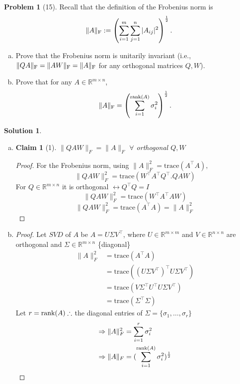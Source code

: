 \documentclass{amsart}[11pt]
\newtheorem*{claim}{Claim}
\theoremstyle{definition}
\newtheorem*{problem}{Problem}
\newtheorem*{solution}{Solution}
\newcommand{\R}{\mathbb{R}}
\newcommand{\rank}{\textnormal{rank}}
\newcommand{\fro}{\textnormal{F}}
\begin{document}
\begin{problem}[15]
Recall that the definition of the Frobenius norm is \[\|A\|_{\fro}:=\left(\sum_{i=1}^m\sum_{j=1}^n|A_{ij}|^2\right)^\frac12.\]
\begin{enumerate}[(a)]
\item Prove that the Frobenius norm is unitarily invariant (i.e., $\|QA\|_{\fro} = \|AW\|_{\fro} = \|A\|_{\fro}$ for any orthogonal matrices $Q,W$). \item Prove that for any $A\in\R^{m\times n}$,
 \[\|A\|_{\fro} = \left(\sum_{i=1}^{\rank(A)} \sigma_i^2\right)^\frac12.\]
\end{enumerate}
\begin{solution}
    \begin{enumerate}[(a)]
        \item \begin{claim}[1]
            $\|QAW\|_F=\|A\|_F$ $\forall$ orthogonal $Q,W$
        \end{claim}
        \begin{proof}
            For the Frobenius norm, using $\|A\|_F^{2} = \mathrm{trace}(A^\top A),$
            \[\|QAW\|_F^{2}=\mathrm{trace}(W^\top A^\top Q^\top.QAW)\] For $Q\in\R^{m\times n}$ it is orthogonal $\leftrightarrow Q^\top Q = I$
            \[\|QAW\|_F^{2}=\mathrm{trace}(W^\top A^\top AW)\]
            \[\|QAW\|_F^{2}=\mathrm{trace}( A^\top A) = \|A\|_F^{2}\]
        \end{proof} 
        \vspace{\baselineskip}
        \item \begin{proof}
            Let $SVD$ of $A$ be $A=U\Sigma V^\top$, where $U\in\R^{m\times m}$ and $V\in\R^{n\times n}$ are orthogonal and $\Sigma \in\R^{m\times n}$ \{diagonal\}
            \begin{align*}
            \|A\|_F^2&=\mathrm{trace}(A^\top A) \\
            &=\mathrm{trace}((U\Sigma V^\top)^\top U\Sigma V^\top) \\
            &= \mathrm{trace}(V\Sigma^\top U^\top U\Sigma V^\top) \\
            &= \mathrm{trace}(\Sigma^\top \Sigma)
            \end{align*}
            Let $r = \rank(A) \therefore$ the diagonal entries of $\Sigma = \{\sigma_1,\dots,\sigma_r\}$
            \begin{align*}
            \Rightarrow\|A\|_F^2&=\sum_{i=1}^{r}\sigma_{i}^{2} \\
            \Rightarrow\|A\|_F&=(\sum_{i=1}^{\rank(A)}\sigma_{i}^{2})^{\frac{1}{2}}
            \end{align*}
        \end{proof}
    \end{enumerate}
\end{solution}
\end{problem}
\end{document}
